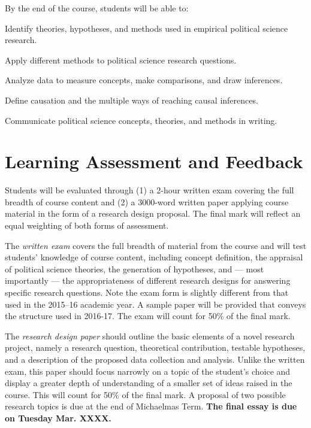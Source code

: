\documentclass[12pt,a4paper]{article}
\begin{document}
By the end of the course, students will be able to:

\begin{enumerate*}
\item Identify theories, hypotheses, and methods used in empirical political science research.
\item Apply different methods to political science research questions.
\item Analyze data to measure concepts, make comparisons, and draw inferences.
\item Define causation and the multiple ways of reaching causal inferences.
\item Communicate political science concepts, theories, and methods in writing.
\end{enumerate*}

\section{Learning Assessment and Feedback}

Students will be evaluated through (1) a 2-hour written exam covering the full breadth of course content and (2) a 3000-word written paper applying course material in the form of a research design proposal. The final mark will reflect an equal weighting of both forms of assessment.

The \textit{written exam} covers the full breadth of material from the course and will test students' knowledge of course content, including concept definition, the appraisal of political science theories, the generation of hypotheses, and --- most importantly --- the appropriateness of different research designs for answering specific research questions. Note the exam form is slightly different from that used in the 2015--16 academic year. A sample paper will be provided that conveys the structure used in 2016-17. The exam will count for 50\% of the final mark.

The \textit{research design paper} should outline the basic elements of a novel research project, namely a research question, theoretical contribution, testable hypotheses, and a description of the proposed data collection and analysis. Unlike the written exam, this paper should focus narrowly on a topic of the student's choice and display a greater depth of understanding of a smaller set of ideas raised in the course. This will count for 50\% of the final mark. A proposal of two possible research topics is due at the end of Michaelmas Term. \textbf{The final essay is due on Tuesday Mar. XXXX.}
\end{document}
